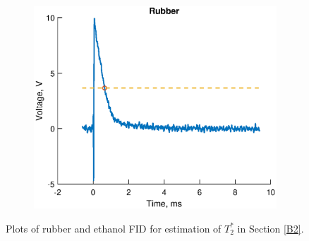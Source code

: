 \begin{figure}[H]
\begin{subfigure}[t]{0.5\textwidth}
        \includegraphics[width=\textwidth]{figures/appendix/A_B2_3.eps}
    \end{subfigure}
    \caption{Plots of rubber and ethanol FID for estimation of $T_2^*$ in Section \ref{B2}.}
    \label{fig:A_B2_estimate}
\end{figure}